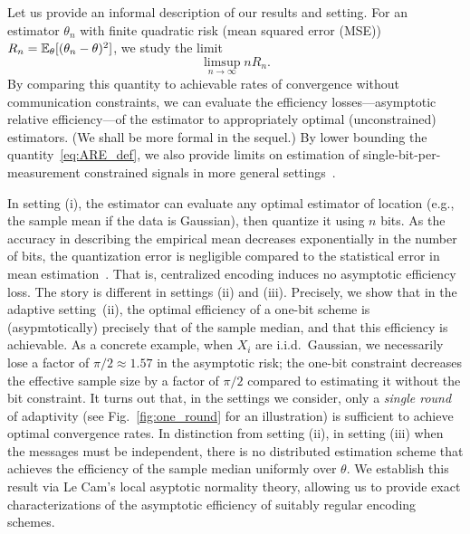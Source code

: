 Let us provide an informal description of our results and setting. For an
estimator $\theta_n$ with finite quadratic risk (mean squared error (MSE)) $R_n =
\mathbb{E}_\theta[(\theta_n - \theta)^2]$, we study the limit
\begin{equation}
  \label{eq:ARE_def}
  \limsup_{n\to \infty} n R_n.
\end{equation}
By comparing this quantity to achievable rates of convergence without
communication constraints, we can evaluate the efficiency
losses---asymptotic relative efficiency---of the estimator to appropriately
optimal (unconstrained) estimators. (We shall be more formal in the sequel.)
By lower bounding the quantity~\eqref{eq:ARE_def}, we also provide limits on
estimation of single-bit-per-measurement constrained signals in more general
settings~\cite{baraniuk2017exponential, jacques2013robust, plan2013one,
  li2017channel, choi2016near}.


In setting (i), the estimator can evaluate any optimal estimator of location
(e.g., the sample mean if the data is Gaussian), then quantize it using
$n$ bits. As the accuracy in describing the empirical mean decreases
exponentially in the number of bits, the quantization error is negligible compared
to the statistical error in mean estimation~\cite{720540, cai2020distributed}. That is,
centralized encoding induces no asymptotic efficiency loss.
%
The story is different in settings (ii) and (iii). Precisely, we show that
in the adaptive setting~(ii), the optimal efficiency of a one-bit scheme is
(asypmtotically) precisely that of the sample median, and that this
efficiency is achievable. As a concrete example, when $X_i$ are
i.i.d.\ Gaussian, we necessarily lose a factor of $\pi/2 \approx 1.57$ in
the asymptotic risk; the one-bit constraint decreases the effective sample
size by a factor of $\pi/2$ compared to estimating it without the bit
constraint. It turns out that, in the settings we consider,
only a \emph{single round} of adaptivity (see Fig.~\ref{fig:one_round} for
an illustration) is sufficient to achieve optimal convergence rates.
%
In distinction from setting (ii), in setting (iii) when the messages must be
independent, there is no distributed estimation scheme that achieves the
efficiency of the sample median uniformly over $\theta$.  We establish this
result via Le Cam's local asyptotic normality theory, allowing us
to provide exact characterizations of the asymptotic efficiency
of suitably regular encoding schemes.

